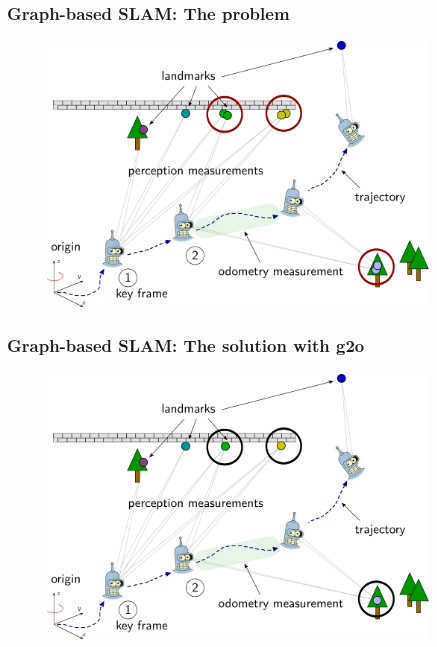 \documentclass[11pt]{beamer}
\begin{document}
\begin{frame}
\frametitle{Graph-based SLAM: The problem}
\begin{figure}[!htb]
\centering
\includegraphics[width=0.9\textwidth]{figures/approach_fundamentals/overview_graphslam_simplified.pdf}
\end{figure}
\vspace{14.9pt}
\end{frame}

\begin{frame}
\frametitle{Graph-based SLAM: The solution with g2o
}
\begin{figure}[!htb]
\centering
\includegraphics[width=0.9\textwidth]{figures/approach_fundamentals/overview_graphslam_simplified_solved.pdf}
\end{figure}
\end{frame}
\end{document}
